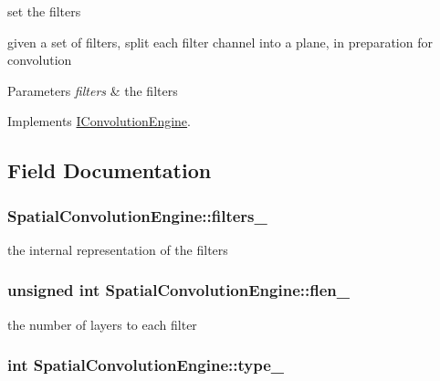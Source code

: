 set the filters 

given a set of filters, split each filter channel into a plane, in preparation for convolution


\begin{DoxyParams}{Parameters}
{\em filters} & the filters \\
\hline
\end{DoxyParams}


Implements \hyperlink{classIConvolutionEngine_a3570aae351b5fcb93bcd87a06c65ea0a}{I\-Convolution\-Engine}.



\subsection{Field Documentation}
\hypertarget{classSpatialConvolutionEngine_aec615ebfbedc8b7812481be1c2bcb1e5}{
\subsubsection[{filters\-\_\-}]{ Spatial\-Convolution\-Engine\-::filters\-\_\-\hspace{0.3cm}{\ttfamily [private]}}}\label{classSpatialConvolutionEngine_aec615ebfbedc8b7812481be1c2bcb1e5}


the internal representation of the filters 

\hypertarget{classSpatialConvolutionEngine_a6f03c3cbd7b42d92e4e83148957d5e16}{
\subsubsection[{flen\-\_\-}]{\setlength{\rightskip}{0pt plus 5cm}unsigned int Spatial\-Convolution\-Engine\-::flen\-\_\-\hspace{0.3cm}{\ttfamily [private]}}}\label{classSpatialConvolutionEngine_a6f03c3cbd7b42d92e4e83148957d5e16}


the number of layers to each filter 

\hypertarget{classSpatialConvolutionEngine_a913adab567840b6d1b2407c3b22ca108}{
\subsubsection[{type\-\_\-}]{\setlength{\rightskip}{0pt plus 5cm}int Spatial\-Convolution\-Engine\-::type\-\_\-\hspace{0.3cm}{\ttfamily [private]}}}\label{classSpatialConvolutionEngine_a913adab567840b6d1b2407c3b22ca108}


